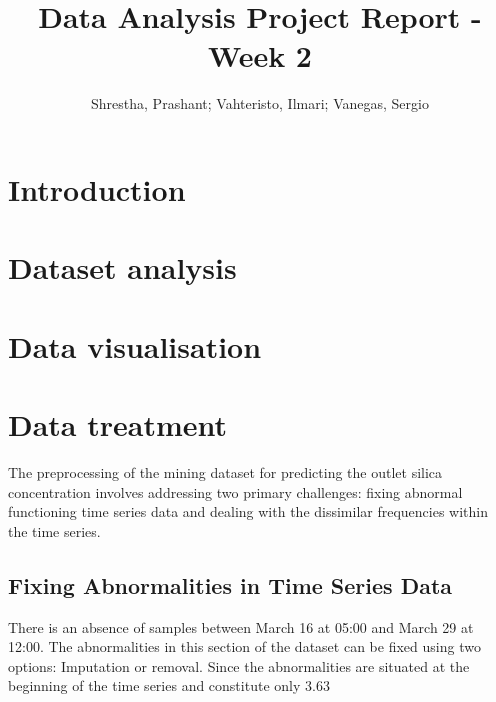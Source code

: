 \documentclass{article}
\title{Data Analysis Project Report - Week 2}
\author{Shrestha, Prashant; Vahteristo, Ilmari; Vanegas, Sergio}
\begin{document}
\maketitle

\section{Introduction} %

\section{Dataset analysis}

\section{Data visualisation}

\section{Data treatment}
The preprocessing of the mining dataset for predicting the outlet silica concentration involves addressing two primary challenges: fixing abnormal functioning time series data and dealing with the dissimilar frequencies within the time series.

\subsection{Fixing Abnormalities in Time Series Data}

There is an absence of samples between March 16 at 05:00 and March 29 at 12:00. The abnormalities in this section of the dataset can be fixed using two options: Imputation or removal. Since the abnormalities are situated at the beginning of the time series and constitute only 3.63%
\end{document}
